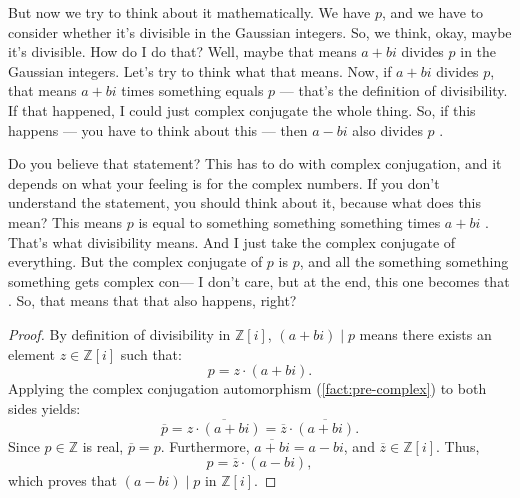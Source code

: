 \begin{speech}[00:04:08 - 00:05:18]
But now we try to think about it mathematically. We have $p$, and we have to consider whether it's divisible in the Gaussian integers. So, we think, okay, maybe it's divisible. How do I do that? Well, maybe that means $a + bi$ divides $p$  in the Gaussian integers. Let's try to think what that means. Now, if $a + bi$ divides $p$, that means $a + bi$ times something equals $p$ --- that's the definition of divisibility. If that happened, I could just complex conjugate the whole thing. So, if this happens --- you have to think about this --- then $a - bi$ also divides $p$ .

Do you believe that statement? This has to do with complex conjugation, and it depends on what your feeling is for the complex numbers. If you don't understand the statement, you should think about it, because what does this mean? This means $p$ is equal to something something something times $a + bi$ . That's what divisibility means. And I just take the complex conjugate of everything. But the complex conjugate of $p$ is $p$, and all the something something something gets complex con--- I don't care, but at the end, this one becomes that . So, that means that that also happens, right?
\end{speech}

\begin{content}

\begin{proof}
By definition of divisibility in $\mathbb{Z}[i]$, $(a + bi) \mid p$ means there exists an element $z \in \mathbb{Z}[i]$ such that:
\[
p = z \cdot (a + bi).
\]
Applying the complex conjugation automorphism (\cref{fact:pre-complex}) to both sides yields:
\[
\overline{p} = \overline{z \cdot (a + bi)} = \overline{z} \cdot \overline{(a + bi)}.
\]
Since $p \in \mathbb{Z}$ is real, $\overline{p} = p$. Furthermore, $\overline{a + bi} = a - bi$, and $\overline{z} \in \mathbb{Z}[i]$. Thus,
\[
p = \overline{z} \cdot (a - bi),
\]
which proves that $(a - bi) \mid p$ in $\mathbb{Z}[i]$.
\end{proof}
\end{content}

